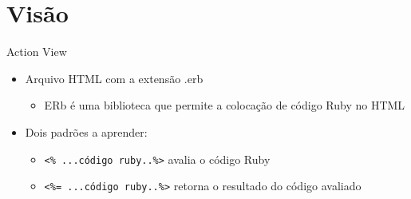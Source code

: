 \section{Visão}
\begin{frame}[t, fragile]{Action View}
	\begin{itemize}
		\item Arquivo HTML com a extensão \alert{.erb}
		\begin{itemize}
			\item ERb é uma \alert{biblioteca} que permite a colocação de código Ruby no HTML
		\end{itemize}

		\item Dois padrões a aprender:
		\begin{itemize}
			\item  \verb|<% ...código ruby..%>| avalia o código Ruby
			\item  \verb|<%= ...código ruby..%>| retorna o resultado do código avaliado 
		\end{itemize}		
		
	\end{itemize}	
\end{frame}